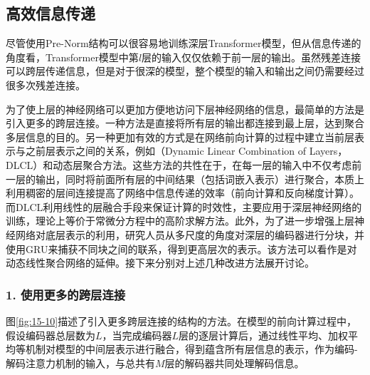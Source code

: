 
\subsection{高效信息传递}

\parinterval 尽管使用Pre-Norm结构可以很容易地训练深层Transformer模型，但从信息传递的角度看，Transformer模型中第$l$层的输入仅仅依赖于前一层的输出。虽然残差连接可以跨层传递信息，但是对于很深的模型，整个模型的输入和输出之间仍需要经过很多次残差连接。

\parinterval 为了使上层的神经网络可以更加方便地访问下层神经网络的信息，最简单的方法是引入更多的跨层连接。一种方法是直接将所有层的输出都连接到最上层，达到聚合多层信息的目的。另一种更加有效的方式是在网络前向计算的过程中建立当前层表示与之前层表示之间的关系，例如{\small{}}（Dynamic Linear Combination of Layers，DLCL）和动态层聚合方法。这些方法的共性在于，在每一层的输入中不仅考虑前一层的输出，同时将前面所有层的中间结果（包括词嵌入表示）进行聚合，本质上利用稠密的层间连接提高了网络中信息传递的效率（前向计算和反向梯度计算）。而DLCL利用线性的层融合手段来保证计算的时效性，主要应用于深层神经网络的训练，理论上等价于常微分方程中的高阶求解方法。此外，为了进一步增强上层神经网络对底层表示的利用，研究人员从多尺度的角度对深层的编码器进行分块，并使用GRU来捕获不同块之间的联系，得到更高层次的表示。该方法可以看作是对动态线性聚合网络的延伸。接下来分别对上述几种改进方法展开讨论。


\subsubsection{1. 使用更多的跨层连接}

\parinterval 图\ref{fig:15-10}描述了引入更多跨层连接的结构的方法。在模型的前向计算过程中，假设编码器总层数为$L$，当完成编码器$L$层的逐层计算后，通过线性平均、加权平均等机制对模型的中间层表示进行融合，得到蕴含所有层信息的表示，作为编码-解码注意力机制的输入，与总共有$M$层的解码器共同处理解码信息。

